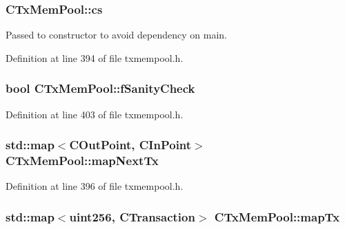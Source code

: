 \subsubsection[{cs}]{ C\+Tx\+Mem\+Pool\+::cs\hspace{0.3cm}{\ttfamily [mutable]}}\label{class_c_tx_mem_pool_ac7ee8c06837c7d2688e2d7e3d071bdbb}


Passed to constructor to avoid dependency on main. 



Definition at line 394 of file txmempool.\+h.

\hypertarget{class_c_tx_mem_pool_a1752e79ce537972fe87e252b9d07d2e0}{}
\subsubsection[{f\+Sanity\+Check}]{\setlength{\rightskip}{0pt plus 5cm}bool C\+Tx\+Mem\+Pool\+::f\+Sanity\+Check}\label{class_c_tx_mem_pool_a1752e79ce537972fe87e252b9d07d2e0}


Definition at line 403 of file txmempool.\+h.

\hypertarget{class_c_tx_mem_pool_aae6f1162f0b2e42b369971f32a9f71e8}{}
\subsubsection[{map\+Next\+Tx}]{\setlength{\rightskip}{0pt plus 5cm}std\+::map$<${\bf C\+Out\+Point}, {\bf C\+In\+Point}$>$ C\+Tx\+Mem\+Pool\+::map\+Next\+Tx}\label{class_c_tx_mem_pool_aae6f1162f0b2e42b369971f32a9f71e8}


Definition at line 396 of file txmempool.\+h.

\hypertarget{class_c_tx_mem_pool_a340d4a897e521b7021e6b22cce951beb}{}
\subsubsection[{map\+Tx}]{\setlength{\rightskip}{0pt plus 5cm}std\+::map$<${\bf uint256}, {\bf C\+Transaction}$>$ C\+Tx\+Mem\+Pool\+::map\+Tx}\label{class_c_tx_mem_pool_a340d4a897e521b7021e6b22cce951beb}


